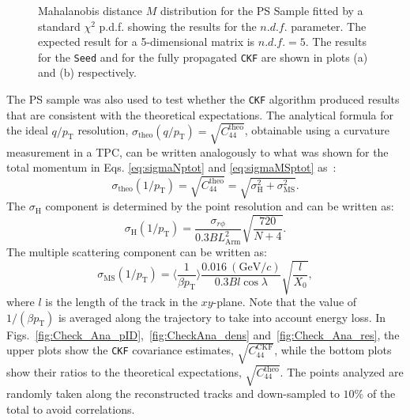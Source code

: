 \begin{figure}[!ht]
\begin{subfigure}[b]{0.48\textwidth}
         \caption{}
         \label{fig:chi2Kalman}
     \end{subfigure}
        \caption{Mahalanobis distance $M$ distribution for the PS Sample fitted by a standard $\chi^2$ p.d.f. showing the results for the $n.d.f.$ parameter. The expected result for a 5-dimensional matrix is $n.d.f. = 5$. The results for the \texttt{Seed} and for the fully propagated \texttt{CKF} are shown in plots (a) and (b) respectively. } \label{fig:chi2}
\end{figure}


The PS sample was also used to test whether the \texttt{CKF} algorithm produced results that are consistent with the theoretical expectations. The analytical formula for the ideal $q/p_{\text{T}}$ resolution, $\sigma_{\text{theo}}(q/p_{\text{T}})=\sqrt{C_{44}^{\textrm{theo}}}$, obtainable using a curvature measurement in a TPC, can be written analogously to what was shown for the total momentum in Eqs. \ref{eq:sigmaNptot} and \ref{eq:sigmaMSptot} as~\cite{PDG:34,Gluckstern:1963}:
\begin{equation}
   \sigma_{\text{theo}}(1/p_{\text{T}}) = \sqrt{C_{44}^{\textrm{theo}}} = \sqrt{\sigma_{\text{H}}^2+\sigma_{\text{MS}}^2}.
\end{equation}
The $\sigma_{\text{H}}$ component is determined by the point resolution and can be written as:
\begin{equation}\label{eq:sigmaN}
    \sigma_{\text{H}}(1/p_{\text{T}})=\frac{\sigma_{r\phi}}{0.3BL_{\textrm{Arm}}^2}\sqrt{\frac{720}{N+4}}.
\end{equation} 
The multiple scattering component can be written as:
\begin{equation}\label{eq:sigmaMS}
    \sigma_{\text{MS}}(1/p_{\text{T}})=\bigg\langle\frac{1}{\beta p_{\text{T}}}\bigg\rangle\frac{0.016 \ (\textrm{GeV}/c)}{0.3 B l\cos\lambda}\sqrt{\frac{l}{X_0}},
\end{equation}
where $l$ is the length of the track in the $xy$-plane. 
Note that the value of $1/\left(\beta p_{\text{T}}\right)$ is averaged along the trajectory to take into account energy loss. In Figs.~\ref{fig:Check_Ana_pID},~\ref{fig:CheckAna_dens} and~\ref{fig:Check_Ana_res},  the upper plots show the \texttt{CKF} covariance estimates, $\sqrt{C_{44}^{\textrm{CKF}}}$, while the bottom plots show their ratios to the theoretical expectations, $\sqrt{C_{44}^{\textrm{theo}}}$. The points analyzed are randomly taken along the reconstructed tracks and down-sampled to $10\%$ of the total to avoid correlations.

